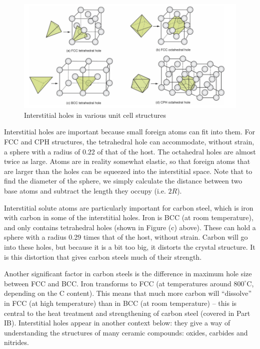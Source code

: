 \documentclass{article}
\begin{document}
\begin{figure}[h]
    \centering
    \includegraphics[width = \textwidth]{images/mat8.png}
    \caption{Interstitial holes in various unit cell structures}
    \label{fig:enter-label}
\end{figure}

Interstitial holes are important because small foreign atoms can fit into them. For FCC and CPH structures, the tetrahedral hole can accommodate, without strain, a sphere with a radius of 0.22 of that of the host. The octahedral holes are almost twice as large. Atoms are in reality somewhat elastic, so that foreign atoms that are larger than the holes can be squeezed into the interstitial space. Note that to find the diameter of the sphere, we simply calculate the distance between two base atoms and subtract the length they occupy (i.e. $2R$).

Interstitial solute atoms are particularly important for carbon steel, which is iron with carbon in some of the interstitial holes. Iron is BCC (at room temperature), and only contains tetrahedral holes (shown in Figure (c) above). These can hold a sphere with a radius 0.29 times that of the host, without strain. Carbon will go into these holes, but because it is a bit too big, it distorts the crystal structure. It is this distortion that gives carbon steels much of their strength. 

Another significant factor in carbon steels is the difference in maximum hole size between FCC and BCC. Iron transforms to FCC (at temperatures around $800^\circ$C, depending on the C content). This means that much more carbon will “dissolve” in FCC (at high temperature) than in BCC (at room temperature) – this is central to the heat treatment and strengthening of carbon steel (covered in Part IB). Interstitial holes appear in another context below: they give a way of understanding the structures of many ceramic compounds: oxides, carbides and nitrides.
\end{document}
